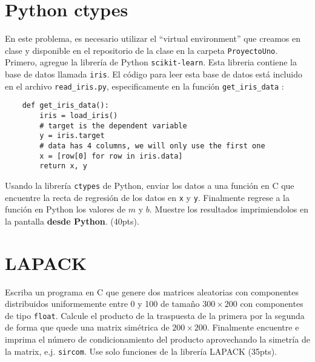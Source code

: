 \documentclass{article}
\begin{document}
\section{Python ctypes}
En este problema, es necesario utilizar el ``virtual environment'' que creamos en clase y disponible en el repositorio de la clase en la carpeta \texttt{ProyectoUno}. Primero, agregue la librería de Python \texttt{scikit-learn}. Esta libreria contiene la base de datos llamada \texttt{iris}. El código para leer esta base de datos está incluido en el archivo \texttt{read\_iris.py}, especificamente en la función \texttt{get\_iris\_data} : 
\begin{verbatim}
    def get_iris_data():
        iris = load_iris()
        # target is the dependent variable
        y = iris.target
        # data has 4 columns, we will only use the first one
        x = [row[0] for row in iris.data]
        return x, y
\end{verbatim}
Usando la librería \texttt{ctypes} de Python, enviar los datos a una función en C que encuentre la recta de regresión de los datos en \texttt{x} y \texttt{y}. Finalmente regrese a la función en Python los valores de $m$ y $b$.  Muestre los resultados imprimiendolos en la pantalla \textbf{desde Python}.  (40pts).

\section{LAPACK}
Escriba un programa en C que genere dos matrices aleatorias con componentes distribuidos uniformemente entre 0 y 100 de  tamaño $300\times 200$ con componentes de tipo \texttt{float}. Calcule el producto de la traspuesta de la primera por la segunda de forma que quede una matrix simétrica de $200\times 200$. Finalmente encuentre e imprima el número de condicionamiento del producto aprovechando la simetría de la matrix, e.j. \texttt{sircom}. Use solo funciones de la librería LAPACK (35pts).
\end{document}
